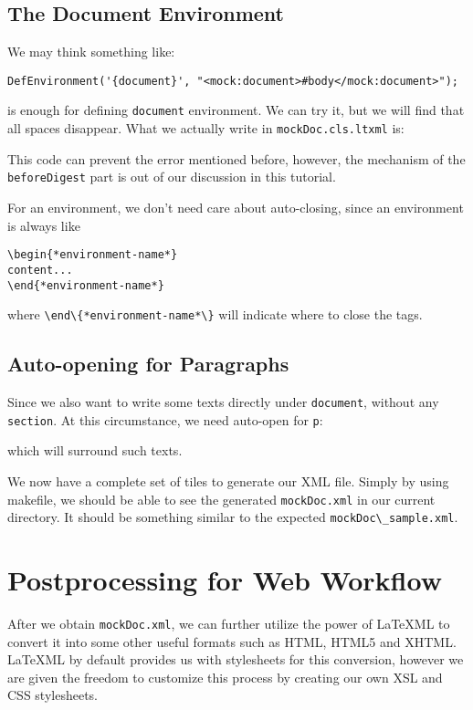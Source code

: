 \documentclass[a4paper]{article}
\def\latexml{{\LaTeX}ML\xspace}
\begin{document}
\subsection{The Document Environment}
We may think something like:
\begin{lstlisting}
DefEnvironment('{document}', "<mock:document>#body</mock:document>");
\end{lstlisting}
is enough for defining \lstinline|document| environment. We can try it, but we will find that all spaces disappear. What we actually write in \lstinline|mockDoc.cls.ltxml| is:
 
This code can prevent the error mentioned before, however, the mechanism of the \lstinline|beforeDigest| part is out of our discussion in this tutorial.

 For an environment, we don't need care about auto-closing, since an environment is always like
\begin{lstlisting}
\begin{*environment-name*}
content...
\end{*environment-name*}
\end{lstlisting}
where \lstinline|\end\{*environment-name*\}| will indicate where to close the tags.

\subsection{Auto-opening for Paragraphs}
Since we also want to write some texts directly under \lstinline|document|, without any \lstinline|section|. At this circumstance, we need auto-open for \lstinline|p|:
 
which will surround such texts.


We now have a complete set of tiles to generate our XML file. Simply by using makefile, we should be able to see the generated \lstinline|mockDoc.xml| in our current directory. It should be something similar to the expected
\lstinline|mockDoc\_sample.xml|.
  
\section{Postprocessing for Web Workflow}\label{sec:posp}
After we obtain \lstinline|mockDoc.xml|, we can further utilize the power of \latexml to convert it into some other
useful formats such as HTML, HTML5 and XHTML. \latexml by default provides us with stylesheets for this conversion, however we are given the freedom to customize this process by creating our own XSL and CSS stylesheets.
\end{document}
